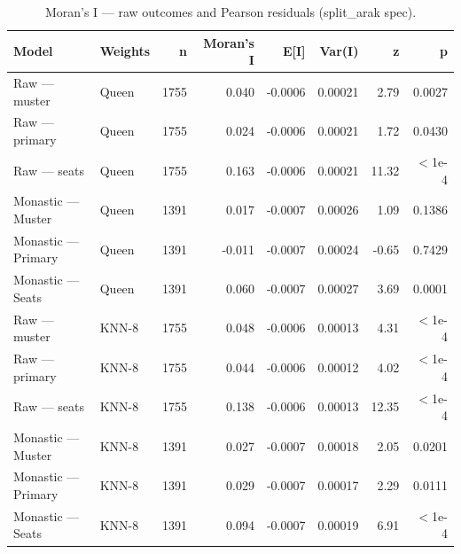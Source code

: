 \begin{table}[H]
\centering
\caption{Moran's I — raw outcomes and Pearson residuals (split_arak spec).} 
\label{tab:moran_nb01}
\begin{tabular}{llrrrrrr}
  \hline
Model & Weights & n & Moran's I & E[I] & Var(I) & z & p \\ 
  \hline
Raw — muster & Queen & 1755 & 0.040 & -0.0006 & 0.00021 & 2.79 & 0.0027 \\ 
  Raw — primary & Queen & 1755 & 0.024 & -0.0006 & 0.00021 & 1.72 & 0.0430 \\ 
  Raw — seats & Queen & 1755 & 0.163 & -0.0006 & 0.00021 & 11.32 & $<$1e-4 \\ 
  Monastic — Muster & Queen & 1391 & 0.017 & -0.0007 & 0.00026 & 1.09 & 0.1386 \\ 
  Monastic — Primary & Queen & 1391 & -0.011 & -0.0007 & 0.00024 & -0.65 & 0.7429 \\ 
  Monastic — Seats & Queen & 1391 & 0.060 & -0.0007 & 0.00027 & 3.69 & 0.0001 \\ 
  Raw — muster & KNN-8 & 1755 & 0.048 & -0.0006 & 0.00013 & 4.31 & $<$1e-4 \\ 
  Raw — primary & KNN-8 & 1755 & 0.044 & -0.0006 & 0.00012 & 4.02 & $<$1e-4 \\ 
  Raw — seats & KNN-8 & 1755 & 0.138 & -0.0006 & 0.00013 & 12.35 & $<$1e-4 \\ 
  Monastic — Muster & KNN-8 & 1391 & 0.027 & -0.0007 & 0.00018 & 2.05 & 0.0201 \\ 
  Monastic — Primary & KNN-8 & 1391 & 0.029 & -0.0007 & 0.00017 & 2.29 & 0.0111 \\ 
  Monastic — Seats & KNN-8 & 1391 & 0.094 & -0.0007 & 0.00019 & 6.91 & $<$1e-4 \\ 
   \hline
\end{tabular}
\end{table}
